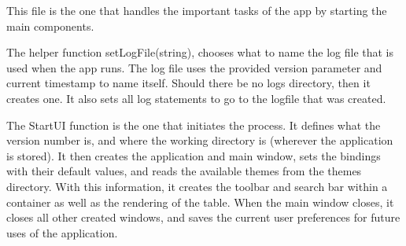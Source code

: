 This file is the one that handles the important tasks of the app by
starting the main components.

The helper function setLogFile(string), chooses what to name the log file
that is used when the app runs.
The log file uses the provided version parameter and current
timestamp to name itself. Should
there be no logs directory, then it creates one.
It also sets all log statements to go to the logfile that was created.

The StartUI function is the one that initiates the process. It
defines what the version number is, and where the working directory
is (wherever the application is stored).
It then creates the application and main window, sets the bindings
with their default values, and reads the available themes from the
themes directory.
With this information, it creates the toolbar and search bar within a
container as well as the rendering of the table.
When the main window closes, it closes all other created windows, and
saves the current user preferences for future uses of the application.
